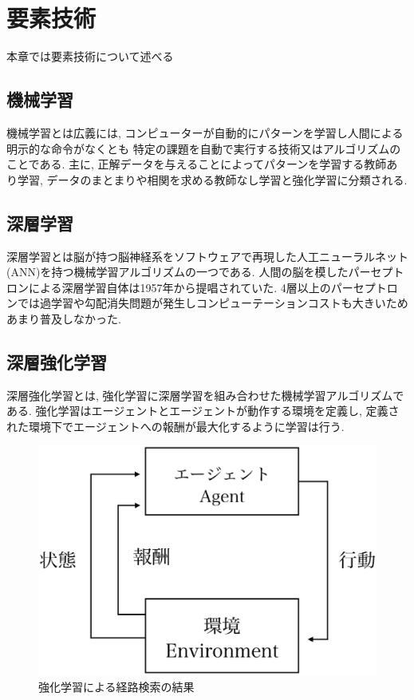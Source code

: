 \chapter{要素技術}
\label{technical_background}

本章では要素技術について述べる


\section{機械学習}

機械学習とは広義には, コンピューターが自動的にパターンを学習し人間による明示的な命令がなくとも
特定の課題を自動で実行する技術又はアルゴリズムのことである. 主に, 正解データを与えることによってパターンを学習する教師あり学習, データのまとまりや相関を求める教師なし学習と強化学習に分類される.


\section{深層学習}

深層学習とは脳が持つ脳神経系をソフトウェアで再現した人工ニューラルネット(ANN)を持つ機械学習アルゴリズムの一つである. 
人間の脳を模したパーセプトロンによる深層学習自体は1957年から提唱されていた. 4層以上のパーセプトロンでは過学習や勾配消失問題が発生しコンピューテーションコストも大きいためあまり普及しなかった.

\section{深層強化学習}

深層強化学習とは, 強化学習に深層学習を組み合わせた機械学習アルゴリズムである.
強化学習はエージェントとエージェントが動作する環境を定義し, 定義された環境下でエージェントへの報酬が最大化するように学習は行う.


\begin{figure}[H]
    \centering  %
    \includegraphics[clip,width = 12.0cm]{assets/reinforcement_learning.eps}
    \caption{強化学習による経路検索の結果}  \label{sample}
\end{figure}

